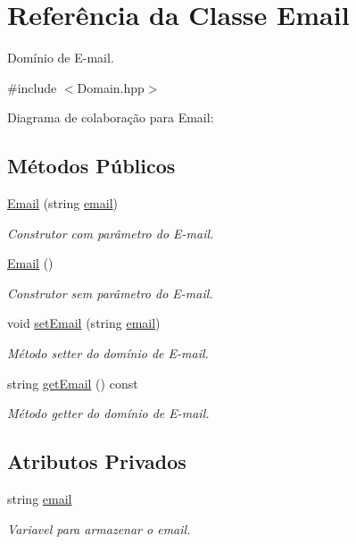 \hypertarget{classEmail}{}\section{Referência da Classe Email}
\label{classEmail}


Domínio de E-\/mail.  




{\ttfamily \#include $<$Domain.\+hpp$>$}



Diagrama de colaboração para Email\+:
\subsection*{Métodos Públicos}
\begin{DoxyCompactItemize}
\item 
\hyperlink{classEmail_af8b9c460e98ace322cf83a3af2509e7c}{Email} (string \hyperlink{classEmail_ac0a91a44652858a0c5178ef836ec9c93}{email})
\begin{DoxyCompactList}\small\item\em Construtor com parâmetro do E-\/mail. \end{DoxyCompactList}\item 
\hyperlink{classEmail_a2cfcfea1e55511208e7858c33f48ad9d}{Email} ()
\begin{DoxyCompactList}\small\item\em Construtor sem parâmetro do E-\/mail. \end{DoxyCompactList}\item 
void \hyperlink{classEmail_a2614b3a19d961411d1bece9c1bdf616f}{set\+Email} (string \hyperlink{classEmail_ac0a91a44652858a0c5178ef836ec9c93}{email})
\begin{DoxyCompactList}\small\item\em Método setter do domínio de E-\/mail. \end{DoxyCompactList}\item 
string \hyperlink{classEmail_aa2898fe9d48e9bf02b32b63fb18b63b9}{get\+Email} () const 
\begin{DoxyCompactList}\small\item\em Método getter do domínio de E-\/mail. \end{DoxyCompactList}\end{DoxyCompactItemize}
\subsection*{Atributos Privados}
\begin{DoxyCompactItemize}
\item 
string \hyperlink{classEmail_ac0a91a44652858a0c5178ef836ec9c93}{email}\hypertarget{classEmail_ac0a91a44652858a0c5178ef836ec9c93}{}\label{classEmail_ac0a91a44652858a0c5178ef836ec9c93}

\begin{DoxyCompactList}\small\item\em Variavel para armazenar o email. \end{DoxyCompactList}\end{DoxyCompactItemize}


